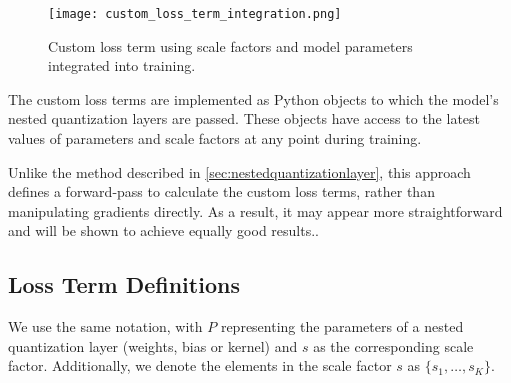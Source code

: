 \begin{figure}[t!]
  \centering
  \texttt{[image: custom\_loss\_term\_integration.png]}
  \caption{Custom loss term using scale factors and model parameters integrated into training.}
  \label{fig:custom_loss_term_integration}
\end{figure}

The custom loss terms are implemented as Python objects
to which the model's nested quantization layers are passed.
These objects have access to the latest values of parameters
and scale factors at any point during training.

Unlike the method described in \cref{sec:nestedquantizationlayer},
this approach defines a forward-pass to calculate the custom loss terms,
rather than manipulating gradients directly.
As a result, it may appear more straightforward
and will be shown to achieve equally good results..

\subsection{Loss Term Definitions}
\label{subsec:losstermdefinitions}

\hspace*{1em} We use the same notation, 
with \( P \) representing the parameters of a nested quantization
layer (weights, bias or kernel) and \( s \) as the corresponding scale factor.
Additionally, we denote the elements in the scale factor \( s \) as \( \{ s_1, \dots, s_K \} \).

